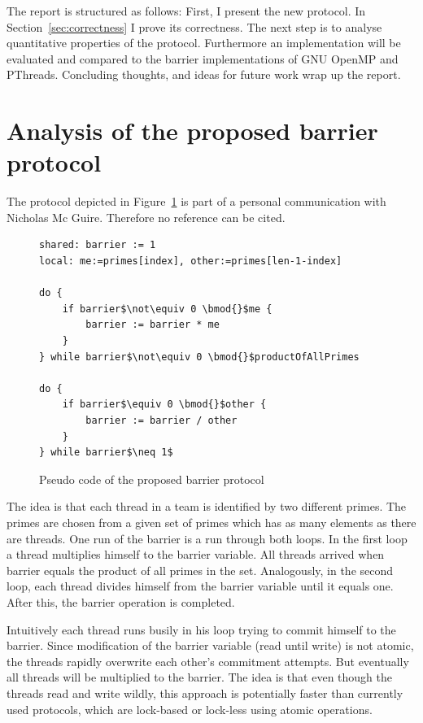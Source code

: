 \documentclass[a4paper, 10pt]{article}
\begin{document}
The report is structured as follows: First, I present the new protocol. In Section~\ref{sec:correctness} I prove its correctness. The next step is to analyse quantitative properties of the protocol. Furthermore an implementation will be evaluated and compared to the barrier implementations of GNU OpenMP\cite{gomp} and PThreads\cite{glibc}. Concluding thoughts, and ideas for future work wrap up the report.

\section{Analysis of the proposed barrier protocol}
The protocol depicted in Figure~\ref{fig:original-barrier-source-code} is part of a personal communication with Nicholas Mc Guire. Therefore no reference can be cited.

\begin{figure}[htbp]
	\centering
	\begin{lstlisting}[mathescape]
shared: barrier := 1
local: me:=primes[index], other:=primes[len-1-index]

do {
	if barrier$\not\equiv 0 \bmod{}$me {
		barrier := barrier * me
	}
} while barrier$\not\equiv 0 \bmod{}$productOfAllPrimes

do {
	if barrier$\equiv 0 \bmod{}$other {
		barrier := barrier / other
	}
} while barrier$\neq 1$
	\end{lstlisting}
	\caption{Pseudo code of the proposed barrier protocol}
	\label{fig:original-barrier-source-code}
\end{figure}
The idea is that each thread in a team is identified by two different primes. The primes are chosen from a given set of primes which has
as many elements as there are threads. One run of the barrier is a run through both loops. In the first loop a thread multiplies himself to the barrier variable. All threads arrived when barrier equals the product of all primes in the set. Analogously, in the second loop, each thread divides himself from the barrier variable until it equals one. After this, the barrier operation is completed.

Intuitively each thread runs busily in his loop trying to commit himself to the barrier. Since modification of the barrier variable (read until write) is not atomic, the threads rapidly overwrite each other's commitment attempts. But eventually all threads will be multiplied to the barrier. The idea is that even though the threads read and write wildly, this approach is potentially faster than currently used protocols, which are lock-based or lock-less using atomic operations.
\end{document}
